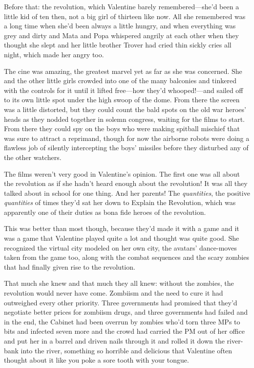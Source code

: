 Before that: the revolution, which Valentine barely
remembered—she’d been a little kid of ten then, not a big girl of
thirteen like now. All she remembered was a long time when she’d
been always a little hungry, and when everything was grey and dirty
and Mata and Popa whispered angrily at each other when they thought
she slept and her little brother Trover had cried thin sickly cries
all night, which made her angry too.

The cine was amazing, the greatest marvel yet as far as she was
concerned. She and the other little girls crowded into one of the
many balconies and tinkered with the controls for it until it
lifted free—how they’d whooped!—and sailed off to its own little
spot under the high swoop of the dome. From there the screen was a
little distorted, but they could count the bald spots on the old
war heroes’ heads as they nodded together in solemn congress,
waiting for the films to start. From there they could spy on the
boys who were making spitball mischief that was sure to attract a
reprimand, though for now the airborne robots were doing a flawless
job of silently intercepting the boys’ missiles before they
disturbed any of the other watchers.

The films weren’t very good in Valentine’s opinion. The first one
was all about the revolution as if she hadn’t heard enough about
the revolution! It was all they talked about in school for one
thing. And her parents! The \emph{quantities}, the positive
\emph{quantities} of times they’d sat her down to Explain the
Revolution, which was apparently one of their duties as bona fide
heroes of the revolution.

This was better than most though, because they’d made it with a
game and it was a game that Valentine played quite a lot and
thought was quite good. She recognized the virtual city modeled on
her own city, the avatars’ dance-moves taken from the game too,
along with the combat sequences and the scary zombies that had
finally given rise to the revolution.

That much she knew and that much they all knew: without the
zombies, the revolution would never have come. Zombiism and the
need to cure it had outweighed every other priority. Three
governments had promised that they’d negotiate better prices for
zombiism drugs, and three governments had failed and in the end,
the Cabinet had been overrun by zombies who’d torn three MPs to
bits and infected seven more and the crowd had carried the PM out
of her office and put her in a barrel and driven nails through it
and rolled it down the river-bank into the river, something so
horrible and delicious that Valentine often thought about it like
you poke a sore tooth with your tongue.

